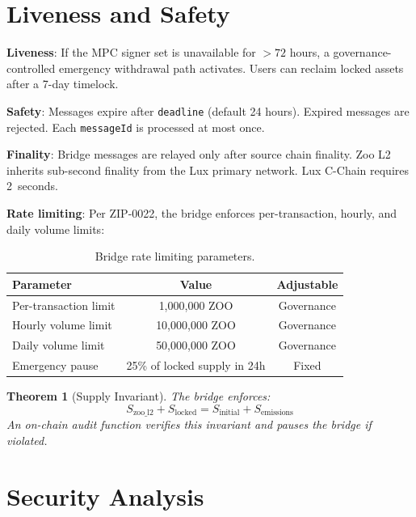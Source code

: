 \documentclass[11pt,letterpaper]{article}
\newtheorem{theorem}{Theorem}[section]
\begin{document}
\section{Liveness and Safety}
\label{sec:liveness}

\textbf{Liveness}: If the MPC signer set is unavailable for $> 72$ hours, a governance-controlled emergency withdrawal path activates. Users can reclaim locked assets after a 7-day timelock.

\textbf{Safety}: Messages expire after \texttt{deadline} (default 24 hours). Expired messages are rejected. Each \texttt{messageId} is processed at most once.

\textbf{Finality}: Bridge messages are relayed only after source chain finality. Zoo L2 inherits sub-second finality from the Lux primary network. Lux C-Chain requires 2~seconds.

\textbf{Rate limiting}: Per ZIP-0022, the bridge enforces per-transaction, hourly, and daily volume limits:

\begin{table}[t]
\centering
\begin{tabular}{lcc}
\toprule
\textbf{Parameter} & \textbf{Value} & \textbf{Adjustable} \\
\midrule
Per-transaction limit & 1,000,000 ZOO & Governance \\
Hourly volume limit & 10,000,000 ZOO & Governance \\
Daily volume limit & 50,000,000 ZOO & Governance \\
Emergency pause & 25\% of locked supply in 24h & Fixed \\
\bottomrule
\end{tabular}
\caption{Bridge rate limiting parameters.}
\label{tab:ratelimit}
\end{table}

\begin{theorem}[Supply Invariant]
The bridge enforces:
\begin{equation}
S_{\text{zoo\_l2}} + S_{\text{locked}} = S_{\text{initial}} + S_{\text{emissions}}
\end{equation}
An on-chain audit function verifies this invariant and pauses the bridge if violated.
\end{theorem}

\section{Security Analysis}
\label{sec:security}
\end{document}
